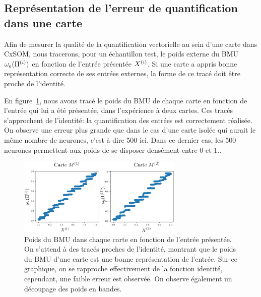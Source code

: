 \subsection{Représentation de l'erreur de quantification dans une carte}

Afin de mesurer la qualité de la quantification vectorielle au sein d'une carte dans CxSOM, nous tracerons, pour un échantillon test, le poids externe du BMU $\omega_e(\Pi^{({i})})$ en fonction de l'entrée présentée $X^{({i})}$. 
Si une carte a appris bonne représentation correcte de ses entrées externes, la forme de ce tracé doit être proche de l'identité. 

En figure~\ref{fig:erreur}, nous avons tracé le poids du BMU de chaque carte en fonction de l'entrée qui lui a été présentée, dans l'expérience à deux cartes. Ces tracés s'approchent de l'identité: la quantification des entrées est correctement réalisée. On observe une erreur plus grande que dans le cas d'une carte isolée qui aurait le même nombre de neurones, c'est à dire 500 ici. Dans ce dernier cas, les 500 neurones permettent aux poids de se disposer densément entre 0 et 1..

\begin{figure}
    \centering
    \includegraphics[width=0.7\textwidth]{w_x.pdf}
    \caption{Poids du BMU dans chaque carte en fonction de l'entrée présentée. On s'attend à des tracés proches de l'identité, montrant que le poids du BMU d'une carte est une bonne représentation de l'entrée. Sur ce graphique, on se rapproche effectivement de la fonction identité, cependant, une faible erreur est observée. On observe également un découpage des poids en bandes.\label{fig:erreur}}
\end{figure}

